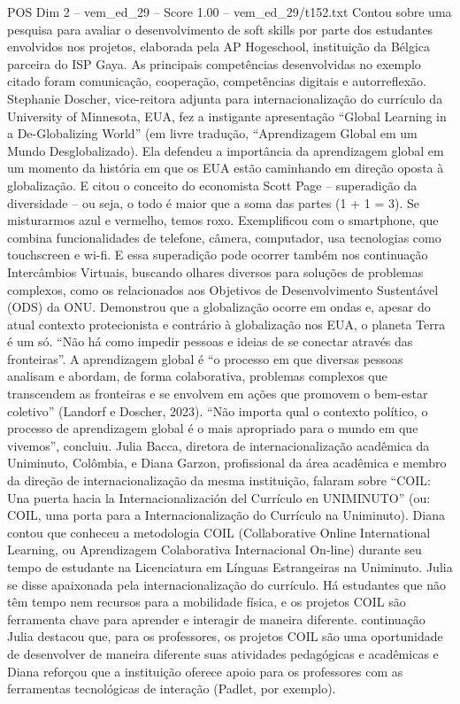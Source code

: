 \begin{textsample}{POS Dim 2 – vem\_ed\_29 – Score 1.00 – vem\_ed\_29/t152.txt}
Contou sobre uma pesquisa para avaliar o desenvolvimento de soft skills por parte dos estudantes envolvidos nos projetos, elaborada pela AP Hogeschool, instituição da Bélgica parceira do ISP Gaya.
As principais competências desenvolvidas no exemplo citado foram comunicação, cooperação, competências digitais e autorreflexão.
Stephanie Doscher, vice-reitora adjunta para internacionalização do currículo da University of Minnesota, EUA, fez a instigante apresentação “Global Learning in a De-Globalizing World” (em livre tradução, “Aprendizagem Global em um Mundo Desglobalizado).
Ela defendeu a importância da aprendizagem global em um momento da história em que os EUA estão caminhando em direção oposta à globalização.
E citou o conceito do economista Scott Page – superadição da diversidade – ou seja, o todo é maior que a soma das partes (1 + 1 = 3).
Se misturarmos azul e vermelho, temos roxo.
Exemplificou com o smartphone, que combina funcionalidades de telefone, câmera, computador, usa tecnologias como touchscreen e wi-fi.
E essa superadição pode ocorrer também nos continuação Intercâmbios Virtuais, buscando olhares diversos para soluções de problemas complexos, como os relacionados aos Objetivos de Desenvolvimento Sustentável (ODS) da ONU.
Demonstrou que a globalização ocorre em ondas e, apesar do atual contexto protecionista e contrário à globalização nos EUA, o planeta Terra é um só. “Não há como impedir pessoas e ideias de se conectar através das fronteiras”.
A aprendizagem global é “o processo em que diversas pessoas analisam e abordam, de forma colaborativa, problemas complexos que transcendem as fronteiras e se envolvem em ações que promovem o bem-estar coletivo” (Landorf e Doscher, 2023). “Não importa qual o contexto político, o processo de aprendizagem global é o mais apropriado para o mundo em que vivemos”, concluiu.
Julia Bacca, diretora de internacionalização acadêmica da Uniminuto, Colômbia, e Diana Garzon, profissional da área acadêmica e membro da direção de internacionalização da mesma instituição, falaram sobre “COIL: Una puerta hacia la Internacionalización del Currículo en UNIMINUTO” (ou: COIL, uma porta para a Internacionalização do Currículo na Uniminuto).
Diana contou que conheceu a metodologia COIL (Collaborative Online International Learning, ou Aprendizagem Colaborativa Internacional On-line) durante seu tempo de estudante na Licenciatura em Línguas Estrangeiras na Uniminuto.
Julia se disse apaixonada pela internacionalização do currículo.
Há estudantes que não têm tempo nem recursos para a mobilidade física, e os projetos COIL são ferramenta chave para aprender e interagir de maneira diferente. continuação Julia destacou que, para os professores, os projetos COIL são uma oportunidade de desenvolver de maneira diferente suas atividades pedagógicas e acadêmicas e Diana reforçou que a instituição oferece apoio para os professores com as ferramentas tecnológicas de interação (Padlet, por exemplo).

\end{textsample}

